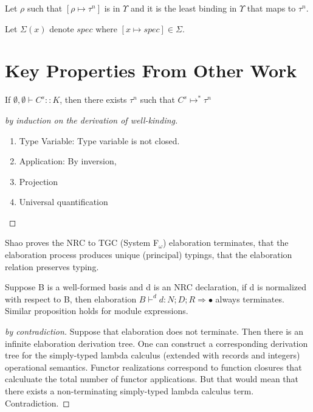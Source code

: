 \begin{definition}
Let $\rho$ such that $[\rho\mapsto\tau^n]$ is in $\Upsilon$ and it is the least binding in $\Upsilon$ that maps to $\tau^n$. 
\end{definition}

\begin{definition}
Let $\Sigma(x)$ denote $spec$ where $[x\mapsto spec] \in \Sigma$.
\end{definition}

\begin{lemma}

\end{lemma}

\section{Key Properties From Other Work}
\begin{theorem}
If $\emptyset,\emptyset\vdash C^s :: K$, then there exists $\tau^n$ such that $C^s \mapsto^*  \tau^n$
\end{theorem}

\begin{proof}[by induction on the derivation of well-kinding]
\begin{enumerate}
\item Type Variable: Type variable is not closed. 
\item Application: By inversion, 
\item Projection
\item Universal quantification
\end{enumerate}
\end{proof}


Shao proves the NRC to TGC (System F$_\omega$) elaboration terminates, that the elaboration process produces unique (principal) typings, that the elaboration relation preserves typing.  

\begin{theorem}[Termination]
Suppose B is a well-formed basis and d is an NRC declaration, if d is
normalized with respect to B, then elaboration $B\vdash^d
d:N;D;R\Rightarrow \bullet$ always terminates. Similar proposition
holds for module expressions. 
\end{theorem}
\begin{proof}[by contradiction]
Suppose that elaboration does not terminate. Then there is an infinite
elaboration derivation tree. One can construct a corresponding
derivation tree for the simply-typed lambda calculus (extended with
records and integers) operational
semantics. Functor realizations correspond to function closures that
calculuate the total number of functor applications. But that would mean that there exists a non-terminating
simply-typed lambda calculus term. Contradiction. 
\end{proof}

